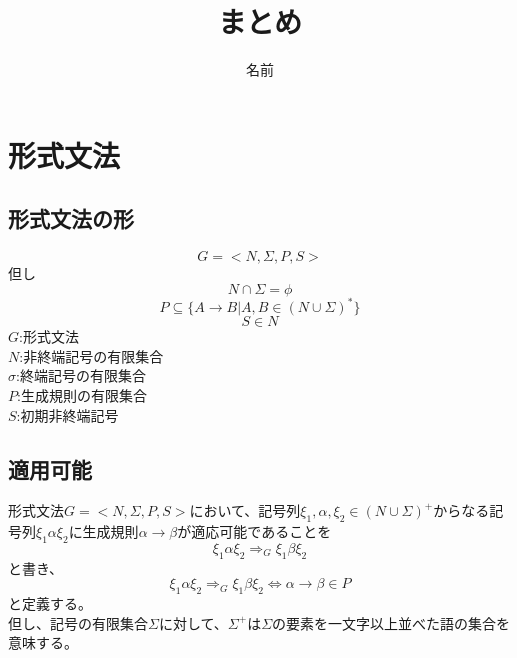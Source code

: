 \documentclass[a4paper]{jarticle}
\title{まとめ}
\author{名前}
\begin{document}
\maketitle
\section{}
\section{}
\section{}
\section{}
\section{形式文法}
\subsection{形式文法の形}
\begin{equation}
G = < N , \Sigma , P , S >
\end{equation}
但し
\begin{equation}
N \cap \Sigma = \phi
\end{equation}
\begin{equation}
P \subseteq \bigl\{ A \to B | A , B \in \left( N \cup \Sigma \right) ^* \bigr\}
\end{equation}
\begin{equation}
S \in N
\end{equation}
$G$:形式文法\\
$N$:非終端記号の有限集合\\
$\sigma$:終端記号の有限集合\\
$P$:生成規則の有限集合\\
$S$:初期非終端記号
\subsection{適用可能}
形式文法$ G = < N , \Sigma , P , S > $において、記号列$ \xi _1 , \alpha , \xi _2 \in \left( N \cup \Sigma \right) ^+ $からなる記号列$ \xi _1 \alpha \xi _2 $に生成規則$ \alpha \to \beta $が適応可能であることを
\begin{equation}
\xi _1 \alpha \xi _2 \Rightarrow _G \xi _1 \beta \xi _2
\end{equation}
と書き、
\begin{equation}
\xi _1 \alpha \xi _2 \Rightarrow _G \xi _1 \beta \xi _2 \iff \alpha \to \beta \in P
\end{equation}
と定義する。\\
但し、記号の有限集合$ \Sigma $に対して、$ \Sigma ^+ $は$ \Sigma $の要素を一文字以上並べた語の集合を意味する。
\end{document}
